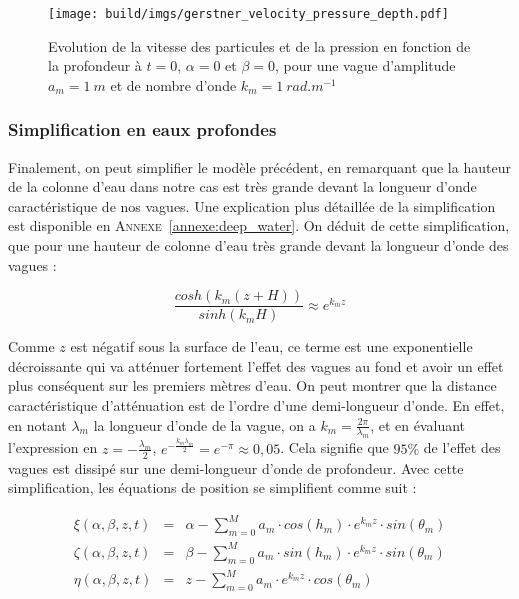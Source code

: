 				\begin{figure}[!htb]
					\centering
					\texttt{[image: build/imgs/gerstner\_velocity\_pressure\_depth.pdf]}
					\caption{Evolution de la vitesse des particules et de la pression en fonction de la profondeur à $t=0$, $\alpha=0$ et $\beta=0$, pour une vague d'amplitude $a_m=1\ m$ et de nombre d'onde $k_m = 1\ rad.m^{-1}$}
					\label{fig:speed_pressure_depth}
				\end{figure}

			\subsubsection{Simplification en eaux profondes}
			\label{sec:simplification_eaux_profondes}
			
				Finalement, on peut simplifier le modèle précédent, en remarquant que la hauteur de la colonne d'eau dans notre cas est très grande devant la longueur d'onde caractéristique de nos vagues. Une explication plus détaillée de la simplification est disponible en \textsc{Annexe}~\ref{annexe:deep_water}. On déduit de cette simplification, que pour une hauteur de colonne d'eau très grande devant la longueur d'onde des vagues :

				\begin{equation}\frac{cosh(k_m(z+H))}{sinh(k_mH)} \approx e^{k_mz} \label{eqn:simplification_eaux_profondes}\end{equation}

				Comme $z$ est négatif sous la surface de l'eau, ce terme est une exponentielle décroissante qui va atténuer fortement l'effet des vagues au fond et avoir un effet plus conséquent sur les premiers mètres d'eau. On peut montrer que la distance caractéristique d'atténuation est de l'ordre d'une demi-longueur d'onde. En effet, en notant $\lambda_m$ la longueur d'onde de la vague, on a $k_m = \tfrac{2\pi}{\lambda_m}$, et en évaluant l'expression en $z = - \tfrac{\lambda_m}{2}$, $e^{-\tfrac{k_m\lambda_m}{2}} = e^{-\pi} \approx 0,05$. Cela signifie que $95 \%$ de l'effet des vagues est dissipé sur une demi-longueur d'onde de profondeur. Avec cette simplification, les équations de position se simplifient comme suit :
			
				\begin{eqnarray}
					\xi(\alpha, \beta, z, t) & = & \alpha - \sum_{m=0}^M a_m \cdot cos(h_m) \cdot e^{k_mz} \cdot sin(\theta_m) \\
					\zeta(\alpha, \beta, z, t) & = & \beta - \sum_{m=0}^M a_m \cdot sin(h_m) \cdot e^{k_mz} \cdot sin(\theta_m) \\
					\eta(\alpha, \beta, z, t) & = & z - \sum_{m=0}^M a_m \cdot e^{k_mz} \cdot cos(\theta_m) \\
				\end{eqnarray}


